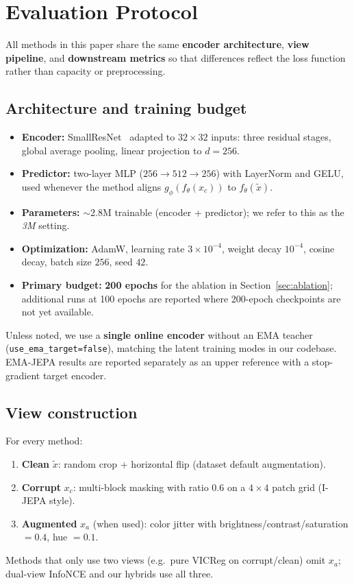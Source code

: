 \section{Evaluation Protocol}
\label{sec:evaluation}

All methods in this paper share the same \textbf{encoder architecture},
\textbf{view pipeline}, and \textbf{downstream metrics} so that differences
reflect the loss function rather than capacity or preprocessing.

\subsection{Architecture and training budget}
\label{sec:eval-arch}

\begin{itemize}
  \item \textbf{Encoder:} SmallResNet~\cite{he2016resnet} adapted to
        $32{\times}32$ inputs: three residual stages, global average pooling,
        linear projection to $d{=}256$.
  \item \textbf{Predictor:} two-layer MLP ($256 \rightarrow 512 \rightarrow 256$)
        with LayerNorm and GELU, used whenever the method aligns
        $g_\phi(f_\theta(x_c))$ to $f_\theta(\tilde{x})$.
  \item \textbf{Parameters:} $\sim$2.8M trainable (encoder + predictor);
        we refer to this as the \emph{3M} setting.
  \item \textbf{Optimization:} AdamW, learning rate $3{\times}10^{-4}$,
        weight decay $10^{-4}$, cosine decay, batch size $256$, seed $42$.
  \item \textbf{Primary budget:} \textbf{200 epochs} for the ablation in
        Section~\ref{sec:ablation}; additional runs at 100 epochs are
        reported where 200-epoch checkpoints are not yet available.
\end{itemize}

Unless noted, we use a \textbf{single online encoder} without an EMA teacher
(\texttt{use\_ema\_target=false}), matching the latent training modes in our
codebase.
EMA-JEPA results are reported separately as an upper reference with a
stop-gradient target encoder.

\subsection{View construction}
\label{sec:eval-views}

For every method:
\begin{enumerate}
  \item \textbf{Clean} $\tilde{x}$: random crop + horizontal flip (dataset
        default augmentation).
  \item \textbf{Corrupt} $x_c$: multi-block masking with ratio $0.6$ on a
        $4{\times}4$ patch grid (I-JEPA style).
  \item \textbf{Augmented} $x_a$ (when used): color jitter with
        brightness/contrast/saturation $=0.4$, hue $=0.1$.
\end{enumerate}
Methods that only use two views (e.g.\ pure VICReg on corrupt/clean) omit
$x_a$; dual-view InfoNCE and our hybrids use all three.

